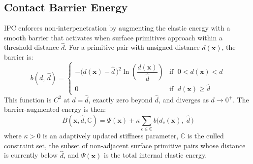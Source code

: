 \documentclass{article}
\begin{document}
\subsection{Contact Barrier Energy}

IPC enforces non-interpenetration by augmenting the elastic energy with a smooth barrier that activates when surface primitives approach within a threshold distance $\hat{d}$. For a primitive pair with unsigned distance $d(\mathbf{x})$, the barrier is:
\begin{equation}
    b(d,\,\hat{d}) =
    \begin{cases}
        -\bigl(d(\mathbf{x}) - \hat{d}\,\bigr)^2
        \ln\!\left(\dfrac{d(\mathbf{x})}{\hat{d}}\right)
        & \text{if }\; 0 < d(\mathbf{x}) < \hat{d} \\[1.5ex]
        0
        & \text{if }\; d(\mathbf{x}) \ge \hat{d}
    \end{cases}
\end{equation}
This function is $C^2$ at $d = \hat{d}$, exactly zero beyond
$\hat{d}$, and diverges as $d \to 0^+$. The barrier-augmented
energy is then:
\begin{equation}
    B(\mathbf{x}, \hat{d}, \mathbb{C})
    = \Psi(\mathbf{x})
      + \kappa \sum_{c \in \mathbb{C}}
        b\bigl(d_c(\mathbf{x}),\;\hat{d}\,\bigr)
\end{equation}
where $\kappa > 0$ is an adaptively updated stiffness parameter, $\mathbb{C}$ is the culled constraint set, the subset of non-adjacent surface primitive pairs whose distance is currently below $\hat{d}$, and $\Psi(\mathbf{x})$ is the total internal elastic energy.

\end{document}
